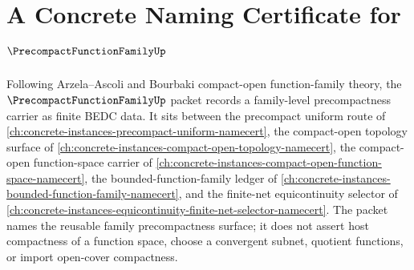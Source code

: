 \chapter{A Concrete Naming Certificate for $\PrecompactFunctionFamilyUp$}
\label{ch:concrete-instances-precompact-function-family-namecert}

Following Arzela--Ascoli and Bourbaki compact-open function-family theory, the $\PrecompactFunctionFamilyUp$ packet records a family-level precompactness carrier as finite BEDC data. It sits between the precompact uniform route of \autoref{ch:concrete-instances-precompact-uniform-namecert}, the compact-open topology surface of \autoref{ch:concrete-instances-compact-open-topology-namecert}, the compact-open function-space carrier of \autoref{ch:concrete-instances-compact-open-function-space-namecert}, the bounded-function-family ledger of \autoref{ch:concrete-instances-bounded-function-family-namecert}, and the finite-net equicontinuity selector of \autoref{ch:concrete-instances-equicontinuity-finite-net-selector-namecert}. The packet names the reusable family precompactness surface; it does not assert host compactness of a function space, choose a convergent subnet, quotient functions, or import open-cover compactness.


